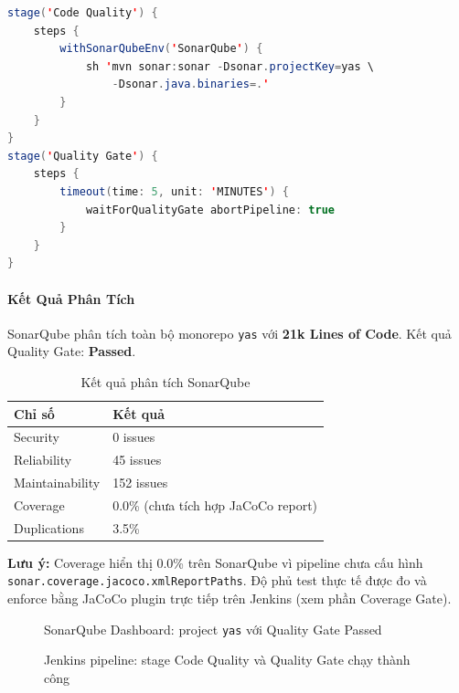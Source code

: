 \begin{lstlisting}[language=Java, caption={Stage Code Quality và Quality Gate trong Jenkinsfile}]
stage('Code Quality') {
    steps {
        withSonarQubeEnv('SonarQube') {
            sh 'mvn sonar:sonar -Dsonar.projectKey=yas \
                -Dsonar.java.binaries=.'
        }
    }
}
stage('Quality Gate') {
    steps {
        timeout(time: 5, unit: 'MINUTES') {
            waitForQualityGate abortPipeline: true
        }
    }
}
\end{lstlisting}

\paragraph{Kết Quả Phân Tích}

SonarQube phân tích toàn bộ monorepo \texttt{yas} với \textbf{21k Lines of Code}. Kết quả Quality Gate: \textbf{Passed}.

\begin{table}[H]
\centering
\caption{Kết quả phân tích SonarQube}
\begin{tabular}{|l|l|}
\hline
\textbf{Chỉ số} & \textbf{Kết quả} \\
\hline
Security & 0 issues \\
\hline
Reliability & 45 issues \\
\hline
Maintainability & 152 issues \\
\hline
Coverage & 0.0\% (chưa tích hợp JaCoCo report) \\
\hline
Duplications & 3.5\% \\
\hline
\end{tabular}
\end{table}

\textbf{Lưu ý:} Coverage hiển thị 0.0\% trên SonarQube vì pipeline chưa cấu hình \texttt{sonar.coverage.jacoco.xmlReportPaths}. Độ phủ test thực tế được đo và enforce bằng JaCoCo plugin trực tiếp trên Jenkins (xem phần Coverage Gate).

\begin{figure}[H]
\centering
{}
\caption{SonarQube Dashboard: project \texttt{yas} với Quality Gate Passed}
\end{figure}

\begin{figure}[H]
\centering
{}
\caption{Jenkins pipeline: stage Code Quality và Quality Gate chạy thành công}
\end{figure}

